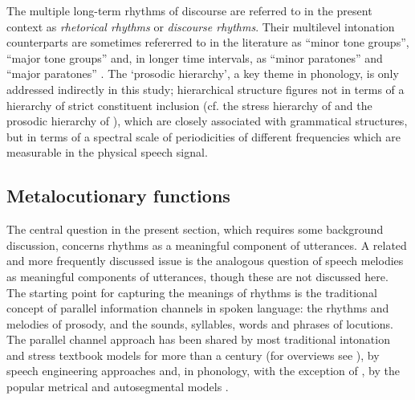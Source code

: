 \documentclass[output=paper,colorlinks,citecolor=brown
]{langscibook}
\begin{document}
The multiple long-term rhythms of discourse are referred to in the present context as \textit{rhetorical rhythms} or \textit{discourse rhythms}. Their multilevel intonation counterparts are sometimes refererred to in the literature as ``minor tone groups'', ``major tone groups'' \cite{trim1959} and, in longer time intervals, as ``minor paratones'' and ``major paratones'' \cite{yuleparatone1980}. The `prosodic hierarchy', a key theme in phonology, is only addressed indirectly in this study; hierarchical structure figures not in terms of a hierarchy of strict constituent inclusion (cf. the stress hierarchy of \cite{chomskyhalle1968} and the prosodic hierarchy of \cite{selkirk1984}), which are closely associated with grammatical structures, but in terms of a spectral scale of periodicities of different frequencies which are measurable in the physical speech signal.

\subsection{Metalocutionary functions}

The central question in the present section, which requires some background discussion, concerns rhythms as a meaningful component of utterances. A related and more frequently discussed issue is the analogous question of speech melodies as meaningful components of utterances, though these are not discussed here. The starting point for capturing the meanings of rhythms is the traditional concept of parallel information channels in spoken language: the rhythms and melodies of prosody, and the sounds, syllables, words and phrases of locutions. The parallel channel approach has been shared by most traditional intonation and stress textbook models for more than a century (for overviews see \cite{gibbon1976, arvaniti2022}), by speech engineering approaches \cite{morikawafujisaki1976, thartcohen73, dutoit2001, fujisaki2004} and, in phonology, with the exception of \cite{chomskyhalle1968}, by the popular metrical and autosegmental models \cite{barnesshattuckhufnagel2022}.
\end{document}
